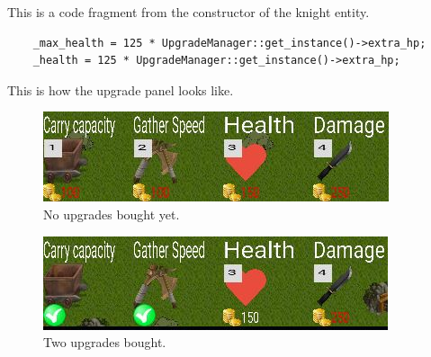 This is a code fragment from the constructor of the knight entity.
\begin{lstlisting}
	_max_health = 125 * UpgradeManager::get_instance()->extra_hp;
    _health = 125 * UpgradeManager::get_instance()->extra_hp;
\end{lstlisting}


This is how the upgrade panel looks like.

\begin{figure}[H]
    \centering
    \includegraphics{res/up.jpg}
    \caption{No upgrades bought yet.}
\end{figure}

\begin{figure}[H]
    \centering
    \includegraphics{res/up2.jpg}
    \caption{Two upgrades bought.}
\end{figure}